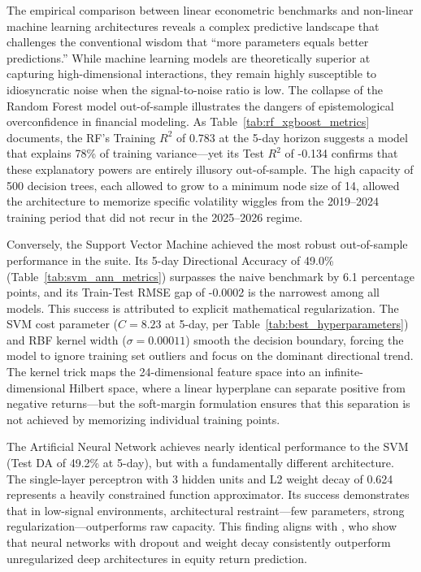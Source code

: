 \documentclass[12pt]{article}
\begin{document}
The empirical comparison between linear econometric benchmarks and non-linear machine learning architectures reveals a complex predictive landscape that challenges the conventional wisdom that ``more parameters equals better predictions.'' While machine learning models are theoretically superior at capturing high-dimensional interactions, they remain highly susceptible to idiosyncratic noise when the signal-to-noise ratio is low. The collapse of the Random Forest model out-of-sample illustrates the dangers of epistemological overconfidence in financial modeling. As Table~\ref{tab:rf_xgboost_metrics} documents, the RF's Training $R^2$ of 0.783 at the 5-day horizon suggests a model that explains 78\% of training variance---yet its Test $R^2$ of -0.134 confirms that these explanatory powers are entirely illusory out-of-sample. The high capacity of 500 decision trees, each allowed to grow to a minimum node size of 14, allowed the architecture to memorize specific volatility wiggles from the 2019--2024 training period that did not recur in the 2025--2026 regime.

Conversely, the Support Vector Machine achieved the most robust out-of-sample performance in the suite. Its 5-day Directional Accuracy of 49.0\% (Table~\ref{tab:svm_ann_metrics}) surpasses the naive benchmark by 6.1 percentage points, and its Train-Test RMSE gap of -0.0002 is the narrowest among all models. This success is attributed to explicit mathematical regularization. The SVM cost parameter ($C = 8.23$ at 5-day, per Table~\ref{tab:best_hyperparameters}) and RBF kernel width ($\sigma = 0.00011$) smooth the decision boundary, forcing the model to ignore training set outliers and focus on the dominant directional trend. The kernel trick maps the 24-dimensional feature space into an infinite-dimensional Hilbert space, where a linear hyperplane can separate positive from negative returns---but the soft-margin formulation ensures that this separation is not achieved by memorizing individual training points.

The Artificial Neural Network achieves nearly identical performance to the SVM (Test DA of 49.2\% at 5-day), but with a fundamentally different architecture. The single-layer perceptron with 3 hidden units and L2 weight decay of 0.624 represents a heavily constrained function approximator. Its success demonstrates that in low-signal environments, architectural restraint---few parameters, strong regularization---outperforms raw capacity. This finding aligns with \textcite{gu2020empirical}, who show that neural networks with dropout and weight decay consistently outperform unregularized deep architectures in equity return prediction.
\end{document}

